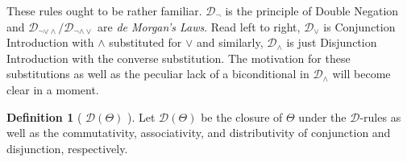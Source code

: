 \documentclass{article}
\theoremstyle{definition}
\theoremstyle{definition}
\theoremstyle{definition}
\theoremstyle{definition}
\newtheorem{definition}{Definition}
\theoremstyle{remark}
\theoremstyle{definition}
\theoremstyle{definition}
\begin{document}


These rules ought to be rather familiar. $ \mathcal{D}_\neg$ is the principle of Double Negation and $ \mathcal{D}_{\neg\vee\wedge}/\mathcal{D}_{\neg\wedge\vee} $ are  \textit{de Morgan's Laws}. Read left to right, $ \mathcal{D}_\vee $ is Conjunction Introduction with $ \wedge $ substituted for $ \vee $ and similarly, $ \mathcal{D}_\wedge $ is just Disjunction Introduction with the converse substitution. The motivation for these substitutions as well as the peculiar lack of a biconditional in $ \mathcal{D}_\wedge $ will become clear in a moment. 


\begin{definition}[\,\,$ \mathcal{D}(\Theta) $\,\,]\label{dclosure}
	Let $ \mathcal{D}(\Theta)$ be the closure of $ \Theta $ under the $ \mathcal{D}$-rules as well as the commutativity, associativity, and distributivity of conjunction and disjunction, respectively.
\end{definition}
\end{document}
